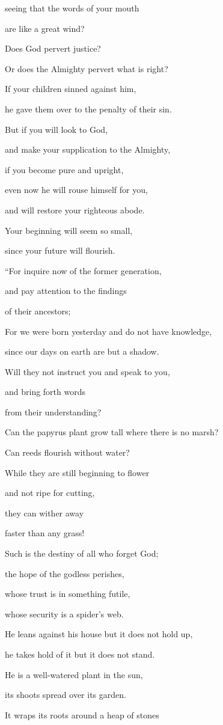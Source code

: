 {\par }{\Q seeing
that the words
of your mouth
\par }{\Q are like a great wind?
\par }{\Q {}Does God
pervert
justice?

\par }{\Q Or
does the Almighty
pervert
what is right?
\par }{\Q {}If
your children
sinned
against him,
\par }{\Q he gave them over
to the penalty of their sin.
\par }{\Q {}But if
you
will look
to
God,
\par }{\Q and make your supplication
to
the Almighty,
\par }{\Q {}if
you become pure
and upright,
\par }{\Q even
now
he will rouse
himself
for
you,
\par }{\Q and will restore
your righteous
abode.
\par }{\Q {}Your beginning
will seem
so small,
\par }{\Q since your future
will flourish.
\par }{\Q {}“For
inquire
now
of the former
generation,
\par }{\Q and pay attention to the findings
\par }{\Q of their ancestors;
\par }{\Q {}For
we
were born yesterday
and do not
have knowledge,
\par }{\Q since
our days
on
earth
are but
a shadow.
\par }{\Q {}Will they
not
instruct
you and speak to you,
\par }{\Q and bring forth
words
\par }{\Q from
their understanding?
\par }{\Q {}Can the papyrus plant
grow tall
where there is no
marsh?
\par }{\Q Can reeds
flourish
without
water?
\par }{\Q {}While they are still
beginning to flower
\par }{\Q and not
ripe
for cutting,
\par }{\Q they can wither
away

\par }{\Q faster than any
grass!
\par }{\Q {}Such is
the destiny
of all
who forget
God;
\par }{\Q the hope
of the godless
perishes,
\par }{\Q {}whose
trust
is in something futile,
\par }{\Q whose security
is a spider’s
web.
\par }{\Q {}He leans
against
his house
but it does not
hold up,
\par }{\Q he takes
hold
of it but it does not
stand.
\par }{\Q {}He is a well-watered
plant in the sun,
\par }{\Q its shoots
spread
over its garden.
\par }{\Q {}It wraps
its roots
around
a heap
of stones

}
